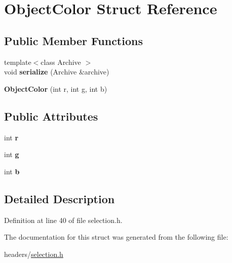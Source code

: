 \hypertarget{structObjectColor}{}\section{Object\+Color Struct Reference}
\label{structObjectColor}
\subsection*{Public Member Functions}
\begin{DoxyCompactItemize}
\item 
\hypertarget{structObjectColor_ab2332614caf0d8db4aa5dfb5154e521c}{}{\footnotesize template$<$class Archive $>$ }\\void {\bfseries serialize} (Archive \&archive)\label{structObjectColor_ab2332614caf0d8db4aa5dfb5154e521c}

\item 
\hypertarget{structObjectColor_abc0870b5b57f7ddbd1c5b6c35440e7f0}{}{\bfseries Object\+Color} (int r, int g, int b)\label{structObjectColor_abc0870b5b57f7ddbd1c5b6c35440e7f0}

\end{DoxyCompactItemize}
\subsection*{Public Attributes}
\begin{DoxyCompactItemize}
\item 
\hypertarget{structObjectColor_a2f0370a2aa8ad4e90a0d679d72bdcd78}{}int {\bfseries r}\label{structObjectColor_a2f0370a2aa8ad4e90a0d679d72bdcd78}

\item 
\hypertarget{structObjectColor_a9b2f93ed12e3e03a30517574c5235981}{}int {\bfseries g}\label{structObjectColor_a9b2f93ed12e3e03a30517574c5235981}

\item 
\hypertarget{structObjectColor_ab0dee6c3856aa0ca9633a35271c78f4e}{}int {\bfseries b}\label{structObjectColor_ab0dee6c3856aa0ca9633a35271c78f4e}

\end{DoxyCompactItemize}


\subsection{Detailed Description}


Definition at line 40 of file selection.\+h.



The documentation for this struct was generated from the following file\+:\begin{DoxyCompactItemize}
\item 
headers/\hyperlink{selection_8h}{selection.\+h}\end{DoxyCompactItemize}
